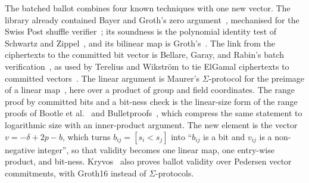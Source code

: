 \documentclass[11pt,a4paper]{article}
\theoremstyle{remark}
\begin{document}
The batched ballot combines four known techniques with one new vector.
The library already contained Bayer and Groth's zero
argument~\cite{bayergroth}, mechanised for the Swiss Post shuffle
verifier~\cite{swisspost}; its soundness is the polynomial identity test of
Schwartz and Zippel~\cite{schwartz,zippel}, and its bilinear map is
Groth's~\cite{groth09}. The link from the ciphertexts to the committed bit
vector is Bellare, Garay, and Rabin's batch verification~\cite{bgr98}, as
used by Terelius and Wikstr{\"o}m to tie ElGamal ciphertexts to committed
vectors~\cite{tereliuswikstrom}. The linear argument is Maurer's
$\Sigma$-protocol for the preimage of a linear map~\cite{maurer}, here over
a product of group and field coordinates. The range proof by committed bits
and a bit-ness check is the linear-size form of the range proofs of Bootle
et al.~\cite{bootle16} and Bulletproofs~\cite{bulletproofs}, which compress
the same statement to logarithmic size with an inner-product argument. The
new element is the vector $v = -\delta + 2p - b$, which turns $b_{ij} = [s_i
< s_j]$ into ``$b_{ij}$ is a bit and $v_{ij}$ is a non-negative integer'',
so that validity becomes one linear map, one entry-wise product, and
bit-ness. Kryvos~\cite{kryvos} also proves ballot validity over Pedersen
vector commitments, with Groth16 instead of $\Sigma$-protocols.
\end{document}
